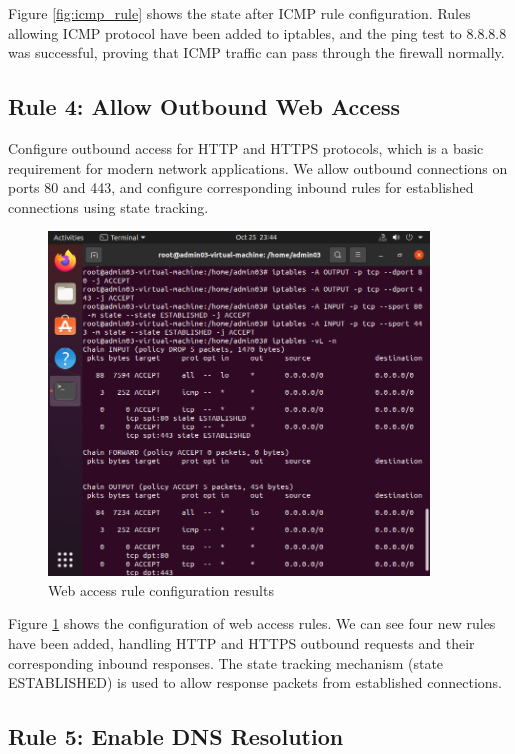 \documentclass[12pt,a4paper]{article}
\begin{document}
Figure \ref{fig:icmp_rule} shows the state after ICMP rule configuration. Rules allowing ICMP protocol have been added to iptables, and the ping test to 8.8.8.8 was successful, proving that ICMP traffic can pass through the firewall normally.

\subsection{Rule 4: Allow Outbound Web Access}

Configure outbound access for HTTP and HTTPS protocols, which is a basic requirement for modern network applications. We allow outbound connections on ports 80 and 443, and configure corresponding inbound rules for established connections using state tracking.

\begin{figure}[H]
    \centering
    \includegraphics[width=0.9\textwidth]{06_web_access_rule.png}
    \caption{Web access rule configuration results}
    \label{fig:web_access_rule}
\end{figure}

Figure \ref{fig:web_access_rule} shows the configuration of web access rules. We can see four new rules have been added, handling HTTP and HTTPS outbound requests and their corresponding inbound responses. The state tracking mechanism (state ESTABLISHED) is used to allow response packets from established connections.

\subsection{Rule 5: Enable DNS Resolution}
\end{document}
